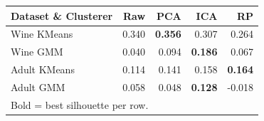\begin{tabular}{lrrrr}
\toprule
Dataset \& Clusterer & Raw & PCA & ICA & RP \\
\midrule
Wine KMeans & 0.340 & \textbf{0.356} & 0.307 & 0.264 \\
Wine GMM & 0.040 & 0.094 & \textbf{0.186} & 0.067 \\
Adult KMeans & 0.114 & 0.141 & 0.158 & \textbf{0.164} \\
Adult GMM & 0.058 & 0.048 & \textbf{0.128} & -0.018 \\
\multicolumn{5}{l}{\footnotesize Bold = best silhouette per row.} \\
\bottomrule
\end{tabular}
